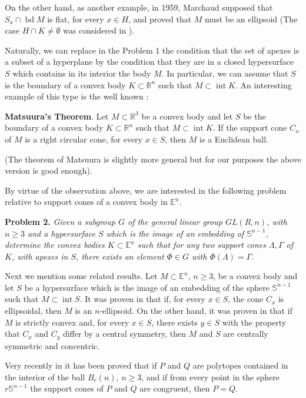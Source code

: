 \documentclass[12pt]{amsart}
\newcommand{\inte}{\operatorname*{int}}
\newcommand{\bd}{\operatorname*{bd}}
\newcommand{\Rt}{\mathbb{R}^3}
\newcommand{\Rn}{\mathbb{R}^{n}}
\begin{document}
On the other hand, as another example, in 1959, Marchaud \cite{Marchaud} supposed that $S_x\cap \bd M$ is flat, for every $x \in H$, and proved that $M$ must be an ellipsoid (The case $H\cap K\not=\emptyset$ was considered in \cite{MM2}). 
 
Naturally, we can replace in the Problem 1 the condition that the set of apexes is a subset of a hyperplane by the condition that they are in a closed hypersurface $S$ which contains in its interior the body $M$. In particular, we can assume that $S$ is the boundary of a convex body $K \subset \Rn$ such that $M \subset \inte K$. An interesting example of this type is the well known \cite{Matsuura}: 
 
\textbf{Matsuura's Theorem}. Let $M \subset \Rt$ be a convex body and let
$S$ be the boundary of a convex body $K \subset \Rn$ such that $M \subset \inte K$. If the support cone $C_x$ of $M$ is a right circular cone, for every $x\in S$, then $M$ is a Euclidean ball.

(The theorem of Matsuura is slightly more general but for our purposes the above version is good enough).   

By virtue of the observation above, we are interested in the following problem relative to support cones of a convex body in $\mathbb{E}^n$. 

\textbf{Problem 2.} \textit{Given a subgroup $G$ of the general linear group $GL(R, n)$, with $n \geq 3$ and a hypersurface $S$ which is the image of an embedding of $\mathbb{S}^{n-1}$, determine the convex bodies $K\subset \mathbb{E}^n$ such that for any two support cones $\Lambda, \Gamma$ of $K$, with apexes in $S$, there exists an element $\Phi \in G$ with $\Phi(\Lambda)=\Gamma$}.

Next we mention  some related results. Let $M\subset \mathbb{E}^n$, $n \geq 3$, be a convex body and let $S$ be a hypersurface which is the image of an embedding of the sphere $\mathbb{S}^{n-1}$ such that $M\subset \inte S$. It was proven in \cite{bg} that if, for every $x \in S$, the cone $C_x$ is ellipsoidal, then $M$ is an $n$-ellipsoid. On the other hand, it was proven in \cite{banda1} that if $M$ is strictly convex and, for every $x \in S$, there exists $y\in S$ with the property that $C_x$ and $C_y$ differ by a central symmetry, then $M$ and $S$ are centrally symmetric and concentric.

Very recently in \cite{Myr}  it has been proved that if $P$ and $Q$ are polytopes contained in the interior of the ball $B_r(n)$, $n\geq 3$, and if from every point in the sphere $r\mathbb{S}^{n-1}$ the support cones of $P$ and $Q$ are congruent, then $P=Q$. 
\end{document}
